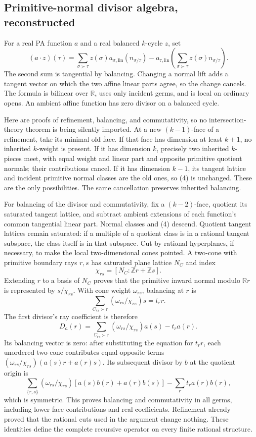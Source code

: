\documentclass[
  10pt,
]{article}
\begin{document}
\subsection{Primitive-normal divisor algebra,
reconstructed}\label{primitive-normal-divisor-algebra-reconstructed}

For a real PA function \(a\) and a real balanced \(k\)-cycle \(z\), set
\[
 (a\cdot z)(\tau)=\sum_{\sigma\succ\tau}z(\sigma)a_{\sigma,\mathrm{lin}}(n_{\sigma/\tau})
 -a_{\tau,\mathrm{lin}}\left(\sum_{\sigma\succ\tau}z(\sigma)n_{\sigma/\tau}\right). \tag{4}
\] The second sum is tangential by balancing. Changing a normal lift
adds a tangent vector on which the two affine linear parts agree, so the
change cancels. The formula is bilinear over \(\mathbb R\), uses only
incident germs, and is local on ordinary opens. An ambient affine
function has zero divisor on a balanced cycle.

Here are proofs of refinement, balancing, and commutativity, so no
intersection-theory theorem is being silently imported. At a new
\((k-1)\)-face of a refinement, take its minimal old face. If that face
has dimension at least \(k+1\), no inherited \(k\)-weight is present. If
it has dimension \(k\), precisely two inherited \(k\)-pieces meet, with
equal weight and linear part and opposite primitive quotient normals;
their contributions cancel. If it has dimension \(k-1\), its tangent
lattice and incident primitive normal classes are the old ones, so (4)
is unchanged. These are the only possibilities. The same cancellation
preserves inherited balancing.

For balancing of the divisor and commutativity, fix a \((k-2)\)-face,
quotient its saturated tangent lattice, and subtract ambient extensions
of each function's common tangential linear part. Normal classes and (4)
descend. Quotient tangent lattices remain saturated: if a multiple of a
quotient class is in a rational tangent subspace, the class itself is in
that subspace. Cut by rational hyperplanes, if necessary, to make the
local two-dimensional cones pointed. A two-cone with primitive boundary
rays \(r,s\) has saturated plane lattice \(N_C\) and index \[
 \chi_{rs}=[N_C:\mathbb Zr+\mathbb Zs].
\] Extending \(r\) to a basis of \(N_C\) proves that the primitive
inward normal modulo \(\mathbb Rr\) is represented by \(s/\chi_{rs}\).
With cone weight \(\omega_{rs}\), balancing at \(r\) is \[
 \sum_{C_{rs}\succ r}(\omega_{rs}/\chi_{rs})s=t_r r.
\] The first divisor's ray coefficient is therefore \[
 D_a(r)=\sum_{C_{rs}\succ r}(\omega_{rs}/\chi_{rs})a(s)-t_ra(r). \tag{5}
\] Its balancing vector is zero: after substituting the equation for
\(t_rr\), each unordered two-cone contributes equal opposite terms
\((\omega_{rs}/\chi_{rs})(a(s)r+a(r)s)\). Its subsequent divisor by
\(b\) at the quotient origin is \[
 \sum_{\{r,s\}}(\omega_{rs}/\chi_{rs})[a(s)b(r)+a(r)b(s)]
                      -\sum_r t_ra(r)b(r),                          \tag{6}
\] which is symmetric. This proves balancing and commutativity in all
germs, including lower-face contributions and real coefficients.
Refinement already proved that the rational cuts used in the argument
change nothing. These identities define the complete recursive operator
on every finite rational structure.
\end{document}
